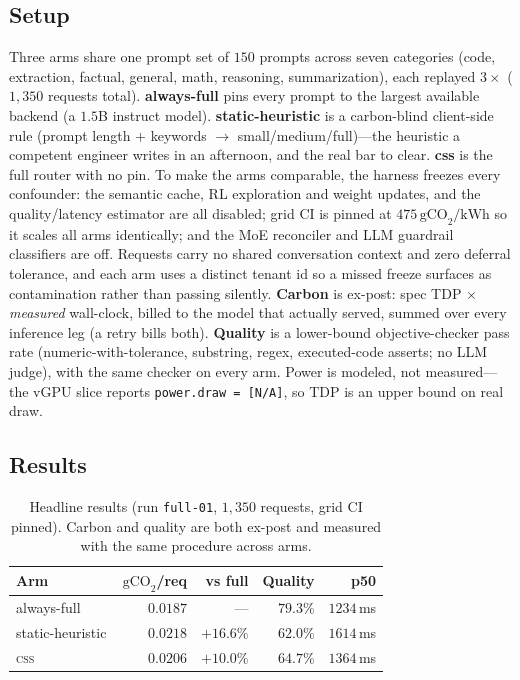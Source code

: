 \documentclass[10pt,twocolumn]{article}
\newcommand{\css}{\textsc{css}}
\newcommand{\gco}{\,\text{gCO}_2}
\newcommand{\gcokwh}{\,\text{gCO}_2/\text{kWh}}
\begin{document}
\subsection{Setup}
Three arms share one prompt set of $150$ prompts across seven categories (code,
extraction, factual, general, math, reasoning, summarization), each replayed
$3\times$ ($1{,}350$ requests total). \textbf{always-full} pins every prompt to
the largest available backend (a $1.5$B instruct model). \textbf{static-heuristic}
is a carbon-blind client-side rule (prompt length $+$ keywords $\to$
small/medium/full)---the heuristic a competent engineer writes in an
afternoon, and the real bar to clear. \textbf{css} is the full router with no
pin. To make the arms comparable, the harness freezes every confounder: the
semantic cache, RL exploration and weight updates, and the quality/latency
estimator are all disabled; grid CI is pinned at $475\gcokwh$ so it scales all
arms identically; and the MoE reconciler and LLM guardrail classifiers are off.
Requests carry no shared conversation context and zero deferral tolerance, and
each arm uses a distinct tenant id so a missed freeze surfaces as contamination
rather than passing silently. \textbf{Carbon} is ex-post: spec TDP $\times$
\emph{measured} wall-clock, billed to the model that actually served, summed
over every inference leg (a retry bills both). \textbf{Quality} is a
lower-bound objective-checker pass rate (numeric-with-tolerance, substring,
regex, executed-code asserts; no LLM judge), with the same checker on every
arm. Power is modeled, not measured---the vGPU slice reports
\texttt{power.draw = [N/A]}, so TDP is an upper bound on real draw.

\subsection{Results}

\begin{table}[t]
  \centering \small
  \begin{tabular}{@{}lrrrr@{}}
    \toprule
    \textbf{Arm} & \textbf{$\gco$/req} & \textbf{vs full} &
    \textbf{Quality} & \textbf{p50} \\
    \midrule
    always-full      & $0.0187$ & ---       & $79.3\%$ & $1234$\,ms \\
    static-heuristic & $0.0218$ & $+16.6\%$  & $62.0\%$ & $1614$\,ms \\
    \css             & $0.0206$ & $+10.0\%$  & $64.7\%$ & $1364$\,ms \\
    \bottomrule
  \end{tabular}
  \caption{Headline results (run \texttt{full-01}, $1{,}350$ requests, grid CI
  pinned). Carbon and quality are both ex-post and measured with the same
  procedure across arms.}
  \label{tab:headline}
\end{table}
\end{document}

